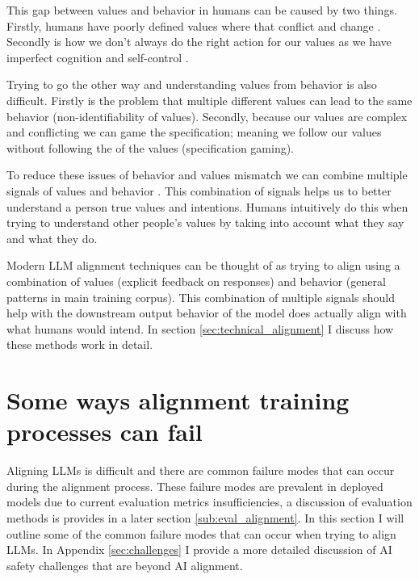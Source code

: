 This gap between values and behavior in humans can be caused by two things. Firstly, humans have poorly defined values where that conflict and change \cite{leonfestingerTheoryCognitiveDissonance1957}. Secondly is how we don't always do the right action for our values as we have imperfect cognition and self-control \cite{aristotleAristotlesNicomacheanEthics350B.C.E,tverskyJudgmentUncertaintyHeuristics1974, simonBehavioralModelRational1955}.

Trying to go the other way and understanding values from behavior is also difficult. Firstly is the problem that multiple different values can lead to the same behavior (non-identifiability of values). Secondly, because our values are complex and conflicting we can game the specification; meaning we follow our values without following the  of the values (specification gaming).

To reduce these issues of behavior and values mismatch we can combine multiple signals of values and behavior \cite{adamowiczCombiningRevealedStated1994}. This combination of signals helps us to better understand a person true values and intentions. Humans intuitively do this when trying to understand other people's values by taking into account what they say and what they do.

Modern LLM alignment techniques can be thought of as trying to align using a combination of values (explicit feedback on responses) and behavior (general patterns in main training corpus). This combination of multiple signals should help with the downstream output behavior of the model does actually align with what humans would intend. In section \ref{sec:technical_alignment} I discuss how these methods work in detail.

\section{Some ways alignment training processes can fail}
\label{sec:alignment_problems}

Aligning LLMs is difficult and there are common failure modes that can occur during the alignment process. These failure modes are prevalent in deployed models due to current evaluation metrics insufficiencies, a discussion of evaluation methods is provides in a later section \ref{sub:eval_alignment}. In this section I will outline some of the common failure modes that can occur when trying to align LLMs. In Appendix \ref{sec:challenges} I provide a more detailed discussion of AI safety challenges that are beyond AI alignment.


